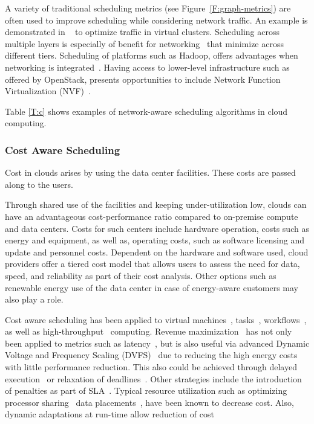 \documentclass[final,5p,times,twocolumn]{elsarticle}
\begin{document}
A variety of traditional scheduling metrics (see Figure~\ref{F:graph-metrics}) are often used to improve scheduling while considering network traffic. An example is demonstrated in ~\cite{yu2017survivable} to optimize traffic in virtual clusters. Scheduling across multiple layers is especially of benefit for networking~\cite{bi2015sla} that minimize across different tiers. Scheduling of platforms such as Hadoop, offers advantages when networking is integrated~\cite{kondikoppa2012network}. Having access to lower-level infrastructure such as offered by OpenStack, presents opportunities to include Network Function Virtualization (NVF)~\cite{lucrezia2015introducing}.

Table \ref{T:c} shows examples of network-aware scheduling algorithms in cloud computing.



%


\subsubsection{Cost Aware Scheduling}\label{sec:cost}


Cost in clouds arises by using the data center facilities. These costs are passed along to the users.

Through shared use of the facilities and keeping under-utilization low, clouds can have an advantageous cost-performance ratio compared to on-premise compute and data centers. Costs for such centers include hardware operation, costs such as energy and equipment, as well as, operating costs, such as software licensing and update and personnel costs. Dependent on the hardware and software used, cloud providers offer a tiered cost model that allows users to assess the need for data, speed, and reliability as part of their cost analysis. Other options such as renewable energy use of the data center in case of energy-aware customers may also play a role.

Cost aware scheduling has been applied to virtual machines~\cite{yuan2017ttsa}, tasks~\cite{yuan2017temporal,zuo2015multi}, workflows~\cite{arabnejad2015cost,arabnejad2016budget}, as well as high-throughput~\cite{yuan2016cawsac} computing. Revenue maximization~\cite{yuan2018warm} has not only been applied to metrics such as latency~\cite{ghahramani2017toward}, but is also useful via advanced Dynamic Voltage and Frequency Scaling (DVFS)~\cite{las10cloudsched,calheiros2014energy} due to reducing the high energy costs with little performance reduction. This also could be achieved through delayed execution~\cite{bi2016trs} or relaxation of deadlines~\cite{zhang2018dynamic}. Other strategies include the introduction of penalties as part of SLA~\cite{wu2012sla}. Typical resource utilization such as optimizing processor sharing~\cite{lee2012profit} data placements~\cite{lee2012profit}, have been known to decrease cost. Also, dynamic adaptations at run-time allow reduction of cost~\cite{ari2013design}
\end{document}
